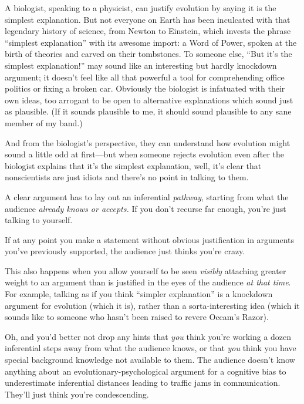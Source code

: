 {
 A biologist, speaking to a physicist, can justify evolution by
saying it is the simplest explanation. But not everyone on Earth has
been inculcated with that legendary history of science, from Newton to
Einstein, which invests the phrase ``simplest
explanation'' with its awesome import: a Word of
Power, spoken at the birth of theories and carved on their tombstones.
To someone else, ``But it's the
simplest explanation!'' may sound like an interesting
but hardly knockdown argument; it doesn't feel like all
that powerful a tool for comprehending office politics or fixing a
broken car. Obviously the biologist is infatuated with their own ideas,
too arrogant to be open to alternative explanations which sound just as
plausible. (If it sounds plausible to me, it should sound plausible to
any sane member of my band.)}

{
 And from the biologist's perspective, they can
understand how evolution might sound a little odd at first---but when
someone rejects evolution even after the biologist explains that
it's the simplest explanation, well,
it's clear that nonscientists are just idiots and
there's no point in talking to them.}

{
 A clear argument has to lay out an inferential \textit{pathway},
starting from what the audience \textit{already knows or accepts.} If
you don't recurse far enough, you're
just talking to yourself.}

{
 If at any point you make a statement without obvious justification
in arguments you've previously supported, the audience
just thinks you're crazy.}

{
 This also happens when you allow yourself to be seen
\textit{visibly} attaching greater weight to an argument than is
justified in the eyes of the audience \textit{at that time}. For
example, talking as if you think ``simpler
explanation'' is a knockdown argument for evolution
(which it is), rather than a sorta-interesting idea (which it sounds
like to someone who hasn't been raised to revere
Occam's Razor).}

{
 Oh, and you'd better not drop any hints that
\textit{you} think you're working a dozen inferential
steps away from what the audience knows, or that \textit{you} think you
have special background knowledge not available to them. The audience
doesn't know anything about an
evolutionary-psychological argument for a cognitive bias to
underestimate inferential distances leading to traffic jams in
communication. They'll just think
you're condescending.}

